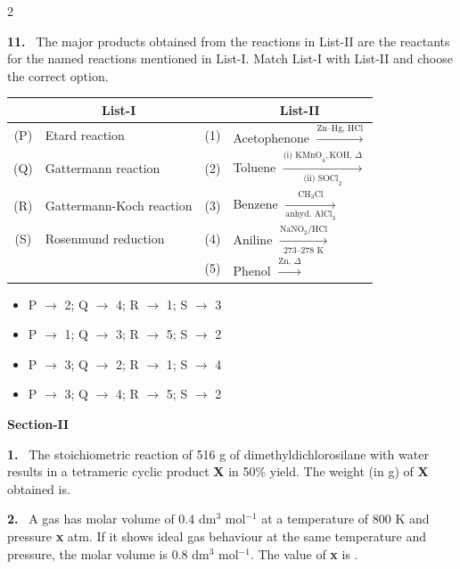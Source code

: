 \documentclass[10pt]{extarticle}
\newcommand{\sect}[1]{\par\smallskip\noindent\textbf{#1}\par}
\newcommand{\qn}[1]{\par\smallskip\noindent\textbf{#1.}~}
\newenvironment{qoptions}{\begin{itemize}[leftmargin=1.8em,itemsep=1pt,topsep=2pt,label={}]}{\end{itemize}}
\newcommand{\opt}[2]{\item[(#1)] #2}
\begin{document}
\begin{multicols}{2}
\qn{11} The major products obtained from the reactions in List-II are the reactants for the named reactions mentioned in List-I. Match List-I with List-II and choose the correct option.\par\nobreak
\begin{center}\small\setlength{\tabcolsep}{3pt}
\begin{tabular}{|c|p{2.3cm}|c|p{3.0cm}|}
\hline
 & \multicolumn{1}{c|}{\textbf{List-I}} & & \multicolumn{1}{c|}{\textbf{List-II}} \\
\hline
(P) & Etard reaction & (1) & Acetophenone $\xrightarrow{\text{Zn--Hg, HCl}}$ \\
\hline
(Q) & Gattermann reaction & (2) & Toluene $\xrightarrow[\text{(ii) SOCl}_2]{\text{(i) KMnO}_4,\text{KOH, }\Delta}$ \\
\hline
(R) & Gattermann-Koch reaction & (3) & Benzene $\xrightarrow[\text{anhyd. AlCl}_3]{\text{CH}_3\text{Cl}}$ \\
\hline
(S) & Rosenmund reduction & (4) & Aniline $\xrightarrow[\text{273--278 K}]{\text{NaNO}_2/\text{HCl}}$ \\
\hline
 & & (5) & Phenol $\xrightarrow{\text{Zn, }\Delta}$ \\
\hline
\end{tabular}
\end{center}
\begin{qoptions}
\opt{A}{P $\to$ 2; Q $\to$ 4; R $\to$ 1; S $\to$ 3}
\opt{B}{P $\to$ 1; Q $\to$ 3; R $\to$ 5; S $\to$ 2}
\opt{C}{P $\to$ 3; Q $\to$ 2; R $\to$ 1; S $\to$ 4}
\opt{D}{P $\to$ 3; Q $\to$ 4; R $\to$ 5; S $\to$ 2}
\end{qoptions}

\sect{Section-II}

\qn{1} The stoichiometric reaction of 516 g of dimethyldichlorosilane with water results in a tetrameric cyclic product \textbf{X} in 50\% yield. The weight (in g) of \textbf{X} obtained is\underline{\hspace{1cm}}.\\
\relax[Use, molar mass (g mol$^{-1}$): H = 1, C = 12, O = 16, Si = 28, Cl = 35.5]

\qn{2} A gas has molar volume of 0.4 dm$^3$ mol$^{-1}$ at a temperature of 800 K and pressure \textbf{x} atm. If it shows ideal gas behaviour at the same temperature and pressure, the molar volume is 0.8 dm$^3$ mol$^{-1}$. The value of \textbf{x} is \underline{\hspace{1cm}}.\\
\relax[Use: Gas constant, R = $8\times10^{-2}$ L atm K$^{-1}$ mol$^{-1}$]


\end{multicols}
\end{document}
